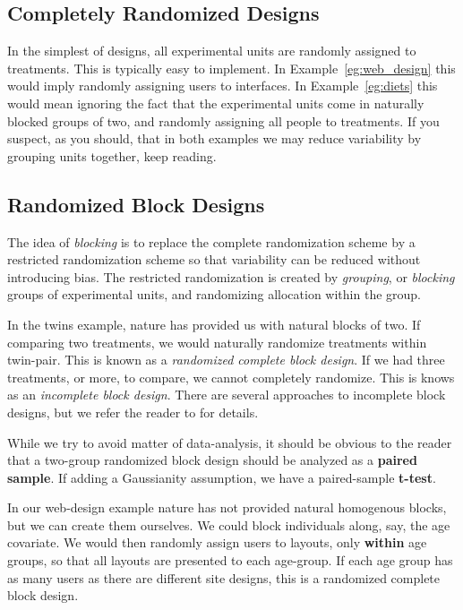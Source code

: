 \subsection{Completely Randomized Designs}
In the simplest of designs, all experimental units are randomly assigned to treatments. 
This is typically easy to implement.
In Example~\ref{eg:web_design} this would imply randomly assigning users to interfaces.
In Example~\ref{eg:diets} this would mean ignoring the fact that the experimental units come in naturally blocked groups of two, and randomly assigning all people to treatments. 
If you suspect, as you should, that in both examples we may reduce variability by grouping units together, keep reading.






\subsection{Randomized Block Designs}
The idea of \emph{blocking} is to replace the complete randomization scheme by a restricted randomization scheme so that variability can be reduced without introducing bias. 
The restricted randomization is created by \emph{grouping}, or \emph{blocking} groups of experimental units, and randomizing allocation within the group. 

In the twins example, nature has provided us with natural blocks of two. 
If comparing two treatments, we would naturally randomize treatments within twin-pair. 
This is known as a \emph{randomized complete block design}. 
If we had three treatments, or more, to compare, we cannot completely randomize. This is knows as an \emph{incomplete block design}. 
There are several approaches to incomplete block designs, but we refer the reader to \cite[Sec.4.2]{cox_theory_2000} for details.

\begin{think}
While we try to avoid matter of data-analysis, it should be obvious to the reader that a two-group randomized block design should be analyzed as a \textbf{paired sample}. 
If adding a Gaussianity assumption, we have a paired-sample \textbf{t-test}. 
\end{think}

In our web-design example nature has not provided natural homogenous blocks, but we can create them ourselves. 
We could block individuals along, say, the age covariate. 
We would then randomly assign users to layouts, only \textbf{within} age groups, so that all layouts are presented to each age-group. 
If each age group has as many users as there are different site designs, this is a randomized complete block design. 


